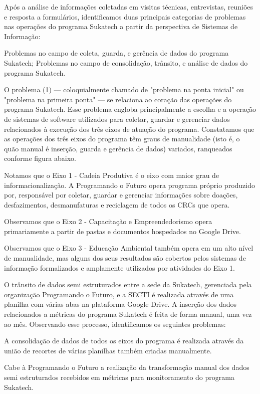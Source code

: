 \documentclass[
	12pt,				%
	openright,			%
	twoside,			%
	a4paper,			%
	english,			%
	french,				%
	spanish,			%
	brazil,				%
	]{abntex2}
\begin{document}
Após a análise de informações coletadas em visitas técnicas, entrevistas, reuniões e resposta a formulários, identificamos duas principais categorias de problemas nas operações do programa Sukatech a partir da perspectiva de Sistemas de Informação:

    Problemas no campo de coleta, guarda, e gerência de dados do programa Sukatech;
    Problemas no campo de consolidação, trânsito, e análise de dados do programa Sukatech.

O problema (1) — coloquialmente chamado de "problema na ponta inicial" ou "problema na primeira ponta" — se relaciona ao coração das operações do programa Sukatech. Esse problema engloba principalmente a escolha e a operação de sistemas de software utilizados para coletar, guardar e gerenciar dados relacionados à execução dos três eixos de atuação do programa. Constatamos que as operações dos três eixos do programa têm graus de manualidade (isto é, o quão manual é inserção, guarda e gerência de dados) variados, ranqueados conforme figura abaixo.

Notamos que o Eixo 1 - Cadeia Produtiva é o eixo com maior grau de informacionalização. A Programando o Futuro opera programa próprio produzido por, responsável por coletar, guardar e gerenciar informações sobre doações, desfazimentos, desmanufaturas e reciclagem de todos os CRCs que opera.

Observamos que o Eixo 2 - Capacitação e Empreendedorismo opera primariamente a partir de pastas e documentos hospedados no Google Drive.

Observamos que o Eixo 3 - Educação Ambiental também opera em um alto nível de manualidade, mas alguns dos seus resultados são cobertos pelos sistemas de informação formalizados e amplamente utilizados por atividades do Eixo 1.

O trânsito de dados semi estruturados entre a sede da Sukatech, gerenciada pela organização Programando o Futuro, e a SECTI é realizada através de uma planilha com várias abas na plataforma Google Drive. A inserção dos dados relacionados a métricas do programa Sukatech é feita de forma manual, uma vez ao mês. Observando esse processo, identificamos os seguintes problemas:

    A consolidação de dados de todos os eixos do programa é realizada através da união de recortes de várias planilhas também criadas manualmente.

    Cabe à Programando o Futuro a realização da transformação manual dos dados semi estruturados recebidos em métricas para monitoramento do programa Sukatech.
\end{document}
